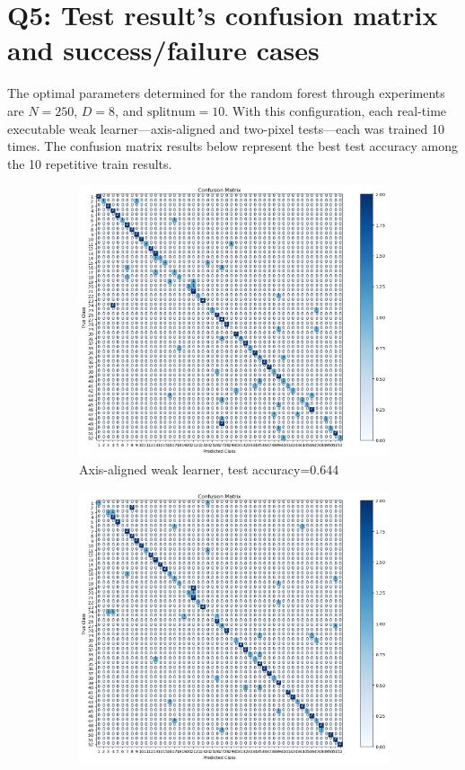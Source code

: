 \section{Q5: Test result's confusion matrix and success/failure cases }
\label{subsec:Q5-1}
The optimal parameters determined for the random forest through experiments are $N=250$, $D=8$, and $\text{splitnum}=10$. With this configuration, each real-time executable weak learner—axis-aligned and two-pixel tests—each was trained 10 times. The confusion matrix results below represent the best test accuracy among the 10 repetitive train results.

\begin{figure}[htbp]
	\centering
	\begin{subfigure}[t]{0.4\linewidth}
		\centering
		\includegraphics[width=\linewidth]{image/q5-fig6.png}
		\caption{Axis-aligned weak learner, test accuracy=0.644}
		\label{fig:q5-fig6}
	\end{subfigure}%
	\quad
	\begin{subfigure}[t]{0.4\linewidth}
		\centering
		\includegraphics[width=\linewidth]{image/q5-fig8.png}

\end{subfigure}
\end{figure}
